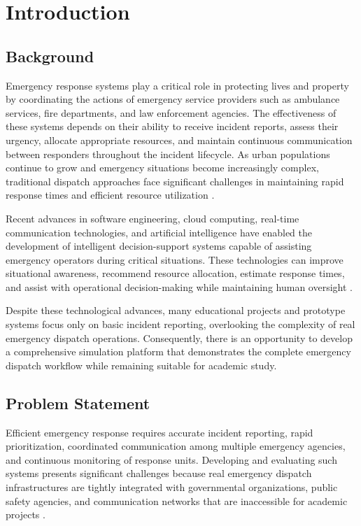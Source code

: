 \chapter{Introduction}
\label{chap:introduction}

\section{Background}

Emergency response systems play a critical role in protecting lives and property by coordinating the actions of emergency service providers such as ambulance services, fire departments, and law enforcement agencies. The effectiveness of these systems depends on their ability to receive incident reports, assess their urgency, allocate appropriate resources, and maintain continuous communication between responders throughout the incident lifecycle. As urban populations continue to grow and emergency situations become increasingly complex, traditional dispatch approaches face significant challenges in maintaining rapid response times and efficient resource utilization \cite{pressman2020se,sommerville2016software}.

Recent advances in software engineering, cloud computing, real-time communication technologies, and artificial intelligence have enabled the development of intelligent decision-support systems capable of assisting emergency operators during critical situations. These technologies can improve situational awareness, recommend resource allocation, estimate response times, and assist with operational decision-making while maintaining human oversight \cite{bass2022software,newman2021microservices}.

Despite these technological advances, many educational projects and prototype systems focus only on basic incident reporting, overlooking the complexity of real emergency dispatch operations. Consequently, there is an opportunity to develop a comprehensive simulation platform that demonstrates the complete emergency dispatch workflow while remaining suitable for academic study.

\section{Problem Statement}

Efficient emergency response requires accurate incident reporting, rapid prioritization, coordinated communication among multiple emergency agencies, and continuous monitoring of response units. Developing and evaluating such systems presents significant challenges because real emergency dispatch infrastructures are tightly integrated with governmental organizations, public safety agencies, and communication networks that are inaccessible for academic projects \cite{pressman2020se}.

